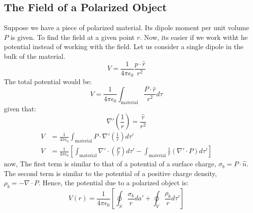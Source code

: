\documentclass{article}
\begin{document}
\subsection{The Field of a Polarized Object}
Suppose we have a piece of polarized material. Its dipole moment per unit volume $P$ is given.
To find the field at a given point $r$. Now, its easier if we work witht he potential instead of working with the field. Let us consider a single dipole in the bulk of the material.\\
\[ V = \frac{1}{4 \pi \epsilon_0} \frac{p \cdot \hat{r}}{r^2} \]
The total potential would be:
\[ V = \frac{1}{4 \pi \epsilon_0}  \int_{\text{material}} \frac{P \cdot \hat{r}}{r^2} d\tau \]
given that:
\[ \nabla' \left(\frac{1}{r}\right) = \frac{\hat{r}}{r^2} \] 
\begin{align*}
    V &= \frac{1}{4 \pi \epsilon_0} \int_{\text{material}} P \cdot \nabla' \left(\frac{1}{r}\right) d\tau' \\
    V &= \frac{1}{4 \pi \epsilon_0} \left[ \int_{\text{material}} \nabla '\cdot \left( \frac{P}{r}\right) d\tau ' - \int_{\text{material}} \frac{1}{r} \left( \nabla ' \cdot P \right) d \tau' \right] 
\end{align*}
now, The first term is similar to that of a potential of a surface charge, $\sigma_b = P \cdot \hat{n}$.
The second term is similar to the potential of a positive charge density, $\rho_b = - \nabla \cdot P$.
Hence, the potential due to a polarized object is:
\[ V(r) = \frac{1}{4 \pi \epsilon_0} \left[ \oint_{S} \frac{\sigma_b}{r} da' + \oint_{V} \frac{\rho_b}{r} d\tau ' \right] \]
\end{document}
